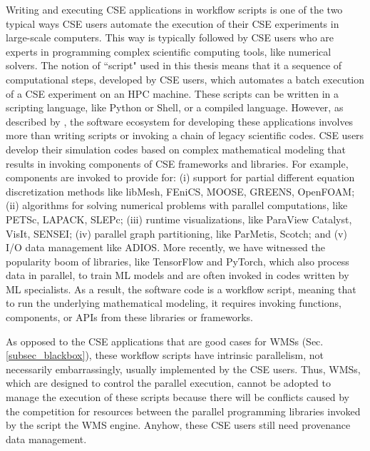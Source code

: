 Writing and executing CSE applications in workflow scripts is one of the two typical ways CSE users automate the execution of their CSE experiments in large-scale computers.
This way is typically followed by CSE users who are experts in programming complex scientific computing tools, like numerical solvers.
The notion of ``script" used in this thesis means that it a sequence of computational steps, developed by CSE users, which automates a batch execution of a CSE experiment on an HPC machine. These scripts can be written in a scripting language, like Python or Shell, or a compiled language.
However, as described by \citet{Silva2018Capturing}, the software ecosystem for developing these applications involves
more than writing scripts or invoking a chain of legacy scientific
codes.
CSE users develop their simulation codes based on
complex mathematical modeling that results in invoking components of CSE
frameworks and libraries. For example, components are invoked to provide
for: (i) support for partial different equation discretization methods like libMesh, FEniCS,
MOOSE, GREENS, OpenFOAM; (ii) algorithms for solving numerical
problems with parallel computations, like PETSc, LAPACK, SLEPc; (iii)
runtime visualizations, like ParaView Catalyst, VisIt, SENSEI; (iv)
parallel graph partitioning, like ParMetis, Scotch; and (v) I/O data
management like ADIOS.
More recently, we have witnessed the popularity boom of  libraries, like TensorFlow and PyTorch, which also process data in parallel, to \eg{} train ML models and are often invoked in codes written by ML specialists.
As a result, the software code is a workflow script, meaning that to run the underlying mathematical modeling, it requires
invoking functions, components, or APIs from these libraries or
frameworks.


As opposed to the CSE applications that are good cases for WMSs (Sec. \ref{subsec_blackbox}), these workflow scripts have intrinsic parallelism, not necessarily embarrassingly, usually implemented by the CSE users.
Thus, WMSs, which are designed to control the parallel execution, cannot be adopted to manage the execution of these scripts because there will be conflicts caused by the competition for resources between the parallel programming libraries invoked by the script the WMS engine. Anyhow, these CSE users still need provenance data management.


